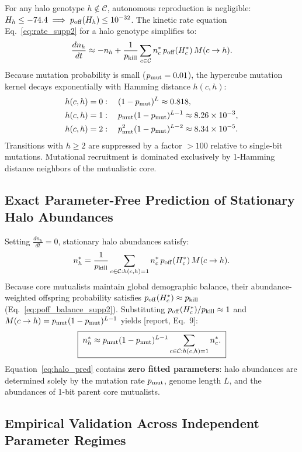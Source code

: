 \documentclass[11pt,a4paper]{article}
\newcommand{\pk}{p_{\rm kill}}
\newcommand{\pmut}{p_{\rm mut}}
\newcommand{\poff}{p_{\rm off}}
\newcommand{\R}[1]{\textcolor{blue!55!black}{[report, #1]}}
\begin{document}
For any halo genotype $h \notin \mathcal{C}$, autonomous reproduction is negligible: $H_h \le -74.4 \implies \poff(H_h) \le 10^{-32}$. The kinetic rate equation Eq.~\eqref{eq:rate_supp2} for a halo genotype simplifies to:
\begin{equation}
\frac{dn_h}{dt} \approx -n_h + \frac{1}{\pk} \sum_{c \in \mathcal{C}} n_c^* \, \poff(H_c^*) \, M(c \to h).
\end{equation}
Because mutation probability is small ($\pmut = 0.01$), the hypercube mutation kernel decays exponentially with Hamming distance $h(c,h)$:
\begin{align}
h(c,h) = 0 &: \quad (1 - \pmut)^L \approx 0.818, \nonumber \\
h(c,h) = 1 &: \quad \pmut (1 - \pmut)^{L-1} \approx 8.26 \times 10^{-3}, \nonumber \\
h(c,h) = 2 &: \quad \pmut^2 (1 - \pmut)^{L-2} \approx 8.34 \times 10^{-5}.
\end{align}
Transitions with $h \ge 2$ are suppressed by a factor $> 100$ relative to single-bit mutations. Mutational recruitment is dominated exclusively by 1-Hamming distance neighbors of the mutualistic core.

\subsection{Exact Parameter-Free Prediction of Stationary Halo Abundances}

Setting $\frac{dn_h}{dt} = 0$, stationary halo abundances satisfy:
\begin{equation}
n_h^* = \frac{1}{\pk} \sum_{c \in \mathcal{C}: h(c,h)=1} n_c^* \, \poff(H_c^*) \, M(c \to h).
\end{equation}
Because core mutualists maintain global demographic balance, their abundance-weighted offspring probability satisfies $\poff(H_c^*) \approx \pk$ (Eq.~\eqref{eq:poff_balance_supp2}). Substituting $\poff(H_c^*) / \pk \approx 1$ and $M(c \to h) = \pmut (1 - \pmut)^{L-1}$ yields \R{Eq.~9}:
\begin{equation}
\boxed{\;n_h^* \approx \pmut (1 - \pmut)^{L-1} \sum_{c \in \mathcal{C}: h(c,h)=1} n_c^*.\;}
\label{eq:halo_pred}
\end{equation}
Equation~\eqref{eq:halo_pred} contains \textbf{zero fitted parameters}: halo abundances are determined solely by the mutation rate $\pmut$, genome length $L$, and the abundances of 1-bit parent core mutualists.

\subsection{Empirical Validation Across Independent Parameter Regimes}
\end{document}
